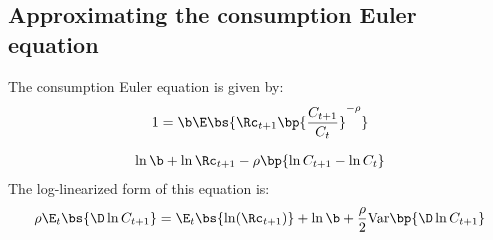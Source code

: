 \subsection{Approximating the consumption Euler equation}

The consumption Euler equation is given by:
\[
1 = \b\E\bs{\Rc_{t+1}\bp{\frac{C_{t+1}}{C_{t}}}^{-\rho}}
\]

\begin{align*}
    \ln\b + \ln\Rc_{t+1} - \rho\bp{\ln C_{t+1} - \ln C_{t}}
\end{align*}
The log-linearized form of this equation is:
\[
\rho\E_{t}\bs{\D\ln C_{t+1}} = \E_{t}\bs{\ln(\Rc_{t+1})} + \ln\b + \frac{\rho}{2}\text{Var}\bp{\D\ln C_{t+1}}
\]